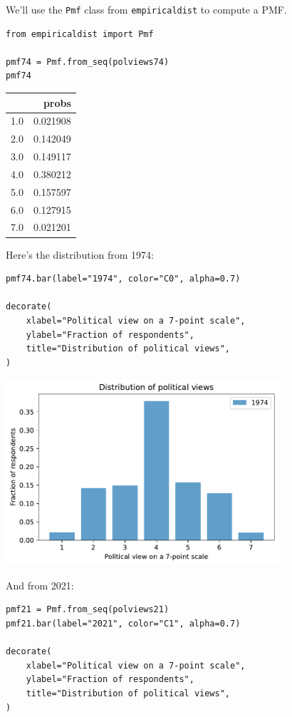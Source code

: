 We'll use the \passthrough{\lstinline!Pmf!} class from
\passthrough{\lstinline!empiricaldist!} to compute a PMF.

\begin{lstlisting}[]
from empiricaldist import Pmf

pmf74 = Pmf.from_seq(polviews74)
pmf74
\end{lstlisting}

\begin{tabular}{lr}
\midrule
{} &     probs \\
\midrule
1.0 &  0.021908 \\
2.0 &  0.142049 \\
3.0 &  0.149117 \\
4.0 &  0.380212 \\
5.0 &  0.157597 \\
6.0 &  0.127915 \\
7.0 &  0.021201 \\
\midrule
\end{tabular}

Here's the distribution from 1974:

\begin{lstlisting}[]
pmf74.bar(label="1974", color="C0", alpha=0.7)

decorate(
    xlabel="Political view on a 7-point scale",
    ylabel="Fraction of respondents",
    title="Distribution of political views",
)
\end{lstlisting}

\begin{center}
\includegraphics[width=4in]{chapters/02_polviews_soln_files/02_polviews_soln_32_0.pdf}
\end{center}

And from 2021:

\begin{lstlisting}[]
pmf21 = Pmf.from_seq(polviews21)
pmf21.bar(label="2021", color="C1", alpha=0.7)

decorate(
    xlabel="Political view on a 7-point scale",
    ylabel="Fraction of respondents",
    title="Distribution of political views",
)
\end{lstlisting}

